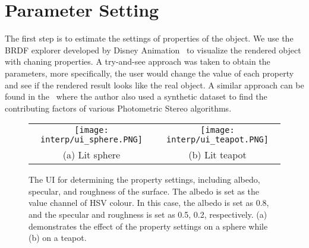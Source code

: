 


\section{Parameter Setting}
The first step is to estimate the settings of properties of the object. We use the BRDF explorer developed by Disney Animation~\cite{disnybrdf} to visualize the rendered object with chaning properties. A try-and-see approach was taken to obtain the parameters, more specifically, the user would change the value of each property and see if the rendered result looks like the real object. A similar approach can be found in the~\cite{Berkiten:2016:ARB} where the author also used a synthetic dataset to find the contributing factors of various Photometric Stereo algorithms.
\begin{figure}[!htbp]
\centering
\begin{tabular}{cc}
  \texttt{[image: interp/ui\_sphere.PNG]}&
  \texttt{[image: interp/ui\_teapot.PNG]}\\
  (a) Lit sphere & (b) Lit teapot\\
\end{tabular}
\caption{The UI for determining the property settings, including albedo, specular, and roughness of the surface. The albedo is set as the value channel of HSV colour. In this case, the albedo is set as 0.8, and the specular and roughness is set as 0.5, 0.2, respectively. (a) demonstrates the effect of the property settings on a sphere while (b) on a teapot.}
\label{fig:ui}
\end{figure}

